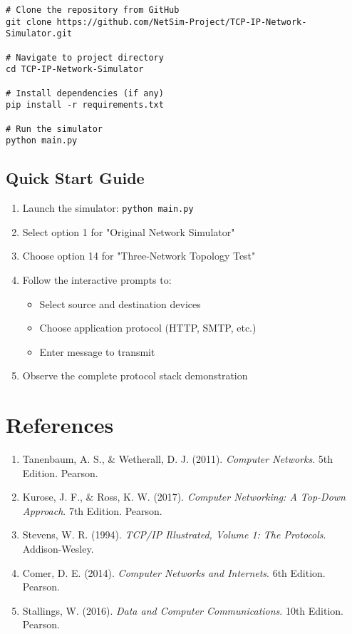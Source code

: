\documentclass[12pt,a4paper]{article}
\begin{document}
\begin{lstlisting}[caption=Installation Commands]
# Clone the repository from GitHub
git clone https://github.com/NetSim-Project/TCP-IP-Network-Simulator.git

# Navigate to project directory
cd TCP-IP-Network-Simulator

# Install dependencies (if any)
pip install -r requirements.txt

# Run the simulator
python main.py
\end{lstlisting}

\subsection{Quick Start Guide}

\begin{enumerate}
\item Launch the simulator: \texttt{python main.py}
\item Select option 1 for "Original Network Simulator"
\item Choose option 14 for "Three-Network Topology Test"
\item Follow the interactive prompts to:
   \begin{itemize}
   \item Select source and destination devices
   \item Choose application protocol (HTTP, SMTP, etc.)
   \item Enter message to transmit
   \end{itemize}
\item Observe the complete protocol stack demonstration
\end{enumerate}

\newpage

\section{References}

\begin{enumerate}
\item Tanenbaum, A. S., \& Wetherall, D. J. (2011). \textit{Computer Networks}. 5th Edition. Pearson.
\item Kurose, J. F., \& Ross, K. W. (2017). \textit{Computer Networking: A Top-Down Approach}. 7th Edition. Pearson.
\item Stevens, W. R. (1994). \textit{TCP/IP Illustrated, Volume 1: The Protocols}. Addison-Wesley.
\item Comer, D. E. (2014). \textit{Computer Networks and Internets}. 6th Edition. Pearson.
\item Stallings, W. (2016). \textit{Data and Computer Communications}. 10th Edition. Pearson.
\end{enumerate}
\end{document}
